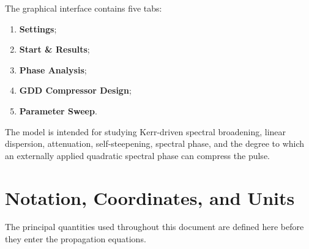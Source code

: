 \documentclass[11pt,a4paper]{article}
\begin{document}
The graphical interface contains five tabs:

\begin{enumerate}
    \item \textbf{Settings};
    \item \textbf{Start \& Results};
    \item \textbf{Phase Analysis};
    \item \textbf{GDD Compressor Design};
    \item \textbf{Parameter Sweep}.
\end{enumerate}

The model is intended for studying Kerr-driven spectral broadening, linear
dispersion, attenuation, self-steepening, spectral phase, and the degree to
which an externally applied quadratic spectral phase can compress the pulse.

\section{Notation, Coordinates, and Units}

The principal quantities used throughout this document are defined here before
they enter the propagation equations.
\end{document}
